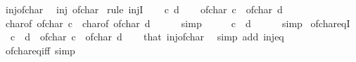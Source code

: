 \begin{isabellebody}
\isanewline
%
\endisadelimproof
\isanewline
{}\isamarkupfalse%
\ inj{\isacharunderscore}{\kern0pt}of{\isacharunderscore}{\kern0pt}char{\isacharcolon}{\kern0pt}\isanewline
\ \ {\isacartoucheopen}inj\ of{\isacharunderscore}{\kern0pt}char{\isacartoucheclose}\isanewline
%
\isadelimproof
%
\endisadelimproof
%
\isatagproof
{}\isamarkupfalse%
\ {\isacharparenleft}{\kern0pt}rule\ injI{\isacharparenright}{\kern0pt}\isanewline
\ \ \isamarkupfalse%
\ c\ d\isanewline
\ \ \isamarkupfalse%
\ {\isachardoublequoteopen}of{\isacharunderscore}{\kern0pt}char\ c\ {\isacharequal}{\kern0pt}\ of{\isacharunderscore}{\kern0pt}char\ d{\isachardoublequoteclose}\isanewline
\ \ \isamarkupfalse%
\ \isamarkupfalse%
\ {\isachardoublequoteopen}char{\isacharunderscore}{\kern0pt}of\ {\isacharparenleft}{\kern0pt}of{\isacharunderscore}{\kern0pt}char\ c{\isacharparenright}{\kern0pt}\ {\isacharequal}{\kern0pt}\ char{\isacharunderscore}{\kern0pt}of\ {\isacharparenleft}{\kern0pt}of{\isacharunderscore}{\kern0pt}char\ d{\isacharparenright}{\kern0pt}{\isachardoublequoteclose}\isanewline
\ \ \ \ \isamarkupfalse%
\ simp\isanewline
\ \ \isamarkupfalse%
\ \isamarkupfalse%
\ {\isachardoublequoteopen}c\ {\isacharequal}{\kern0pt}\ d{\isachardoublequoteclose}\isanewline
\ \ \ \ \isamarkupfalse%
\ simp\isanewline
{}\isamarkupfalse%
%
\endisatagproof
{\isafoldproof}%
%
\isadelimproof
\isanewline
%
\endisadelimproof
\isanewline
{}\isamarkupfalse%
\ of{\isacharunderscore}{\kern0pt}char{\isacharunderscore}{\kern0pt}eqI{\isacharcolon}{\kern0pt}\isanewline
\ \ {\isacartoucheopen}c\ {\isacharequal}{\kern0pt}\ d{\isacartoucheclose}\ \ {\isacartoucheopen}of{\isacharunderscore}{\kern0pt}char\ c\ {\isacharequal}{\kern0pt}\ of{\isacharunderscore}{\kern0pt}char\ d{\isacartoucheclose}\isanewline
%
\isadelimproof
\ \ %
\endisadelimproof
%
\isatagproof
{}\isamarkupfalse%
\ that\ inj{\isacharunderscore}{\kern0pt}of{\isacharunderscore}{\kern0pt}char\ \isamarkupfalse%
\ {\isacharparenleft}{\kern0pt}simp\ add{\isacharcolon}{\kern0pt}\ inj{\isacharunderscore}{\kern0pt}eq{\isacharparenright}{\kern0pt}%
\endisatagproof
{\isafoldproof}%
%
\isadelimproof
\isanewline
%
\endisadelimproof
\isanewline
{}\isamarkupfalse%
\ of{\isacharunderscore}{\kern0pt}char{\isacharunderscore}{\kern0pt}eq{\isacharunderscore}{\kern0pt}iff\ {\isacharbrackleft}{\kern0pt}simp{\isacharbrackright}{\kern0pt}{\isacharcolon}{\kern0pt}\isanewline

\end{isabellebody}
